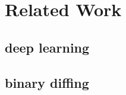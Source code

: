 \documentclass[10pt,conference]{IEEEtran}
\begin{document}
\section{Related Work}

\subsection{deep learning}

\subsection{binary diffing}

%
%



%
%
\end{document}
